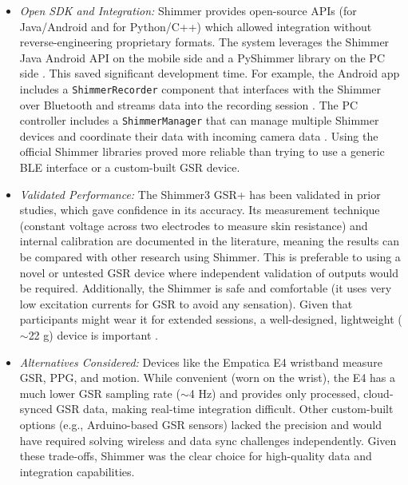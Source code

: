 \begin{itemize}
  \item \emph{Open SDK and Integration:} Shimmer provides open-source APIs (for Java/Android and for Python/C++) which allowed integration without reverse-engineering proprietary formats. The system leverages the Shimmer Java Android API on the mobile side and a PyShimmer library on the PC side \cite{ref15}. This saved significant development time. For example, the Android app includes a \texttt{ShimmerRecorder} component that interfaces with the Shimmer over Bluetooth and streams data into the recording session \cite{ref15}. The PC controller includes a \texttt{ShimmerManager} that can manage multiple Shimmer devices and coordinate their data with incoming camera data \cite{ref15}. Using the official Shimmer libraries proved more reliable than trying to use a generic BLE interface or a custom-built GSR device.
  \item \emph{Validated Performance:} The Shimmer3 GSR+ has been validated in prior studies, which gave confidence in its accuracy. Its measurement technique (constant voltage across two electrodes to measure skin resistance) and internal calibration are documented in the literature, meaning the results can be compared with other research using Shimmer. This is preferable to using a novel or untested GSR device where independent validation of outputs would be required. Additionally, the Shimmer is safe and comfortable (it uses very low excitation currents for GSR to avoid any sensation). Given that participants might wear it for extended sessions, a well-designed, lightweight ($\sim$22 g) device is important \cite{ref8}.
  \item \emph{Alternatives Considered:} Devices like the Empatica E4 wristband measure GSR, PPG, and motion. While convenient (worn on the wrist), the E4 has a much lower GSR sampling rate ($\sim$4 Hz) and provides only processed, cloud-synced GSR data, making real-time integration difficult. Other custom-built options (e.g., Arduino-based GSR sensors) lacked the precision and would have required solving wireless and data sync challenges independently. Given these trade-offs, Shimmer was the clear choice for high-quality data and integration capabilities.
\end{itemize}


